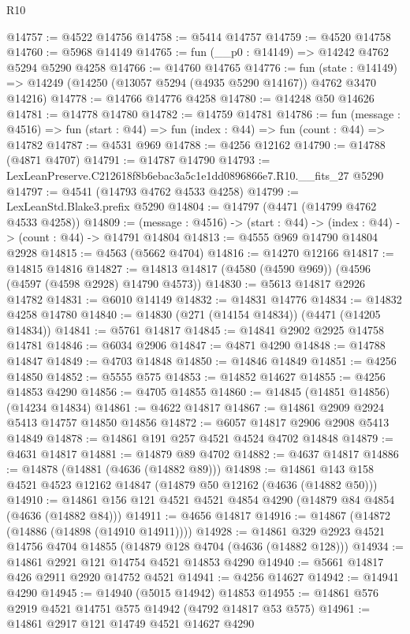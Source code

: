\begin{lexlean}{R10}
\begin{coremodule}
@14757 := @4522 @14756
@14758 := @5414 @14757
@14759 := @4520 @14758
@14760 := @5968 @14149
@14765 := fun (__p0 : @14149) => @14242 @4762 @5294 @5290 @4258
@14766 := @14760 @14765
@14776 := fun (state : @14149) =>
  @14249 (@14250 (@13057 @5294 (@4935 @5290 @14167)) @4762 @3470 @14216)
@14778 := @14766 @14776 @4258
@14780 := @14248 @50 @14626
@14781 := @14778 @14780
@14782 := @14759 @14781
@14786 := fun (message : @4516) =>
  fun (start : @44) => fun (index : @44) => fun (count : @44) => @14782
@14787 := @4531 @969
@14788 := @4256 @12162
@14790 := @14788 (@4871 @4707)
@14791 := @14787 @14790
@14793 := LexLeanPreserve.C212618f8b6ebac3a5c1e1dd0896866e7.R10.__fits_27 @5290
@14797 := @4541 (@14793 @4762 @4533 @4258)
@14799 := LexLeanStd.Blake3.prefix @5290
@14804 := @14797 (@4471 (@14799 @4762 @4533 @4258))
@14809 := (message : @4516) -> (start : @44) -> (index : @44) -> (count : @44) -> @14791 @14804
@14813 := @4555 @969 @14790 @14804 @2928
@14815 := @4563 (@5662 @4704)
@14816 := @14270 @12166
@14817 := @14815 @14816
@14827 := @14813 @14817 (@4580 (@4590 @969)) (@4596 (@4597 (@4598 @2928) @14790 @4573))
@14830 := @5613 @14817 @2926 @14782
@14831 := @6010 @14149
@14832 := @14831 @14776
@14834 := @14832 @4258 @14780
@14840 := @14830 (@271 (@14154 @14834)) (@4471 (@14205 @14834))
@14841 := @5761 @14817
@14845 := @14841 @2902 @2925 @14758 @14781
@14846 := @6034 @2906
@14847 := @4871 @4290
@14848 := @14788 @14847
@14849 := @4703 @14848
@14850 := @14846 @14849
@14851 := @4256 @14850
@14852 := @5555 @575
@14853 := @14852 @14627
@14855 := @4256 @14853 @4290
@14856 := @4705 @14855
@14860 := @14845 (@14851 @14856) (@14234 @14834)
@14861 := @4622 @14817
@14867 := @14861 @2909 @2924 @5413 @14757 @14850 @14856
@14872 := @6057 @14817 @2906 @2908 @5413 @14849
@14878 := @14861 @191 @257 @4521 @4524 @4702 @14848
@14879 := @4631 @14817
@14881 := @14879 @89 @4702
@14882 := @4637 @14817
@14886 := @14878 (@14881 (@4636 (@14882 @89)))
@14898 := @14861 @143 @158 @4521 @4523 @12162 @14847 (@14879 @50 @12162 (@4636 (@14882 @50)))
@14910 := @14861 @156 @121 @4521 @4521 @4854 @4290 (@14879 @84 @4854 (@4636 (@14882 @84)))
@14911 := @4656 @14817
@14916 := @14867 (@14872 (@14886 (@14898 (@14910 @14911))))
@14928 := @14861 @329 @2923 @4521 @14756 @4704 @14855 (@14879 @128 @4704 (@4636 (@14882 @128)))
@14934 := @14861 @2921 @121 @14754 @4521 @14853 @4290
@14940 := @5661 @14817 @426 @2911 @2920 @14752 @4521
@14941 := @4256 @14627
@14942 := @14941 @4290
@14945 := @14940 (@5015 @14942) @14853
@14955 := @14861 @576 @2919 @4521 @14751 @575 @14942 (@4792 @14817 @53 @575)
@14961 := @14861 @2917 @121 @14749 @4521 @14627 @4290

\end{coremodule}
\end{lexlean}
